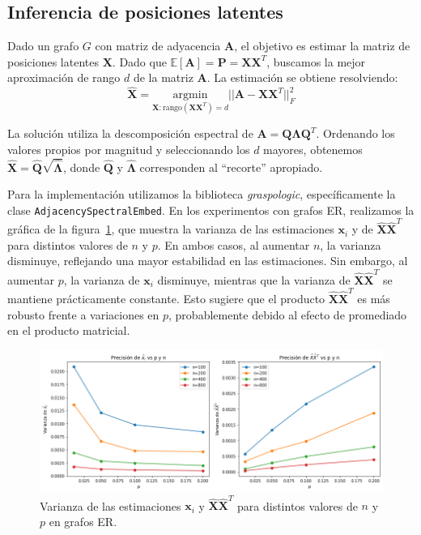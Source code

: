 \documentclass{article}
\begin{document}
\subsection{Inferencia de posiciones latentes}

Dado un grafo $G$ con matriz de adyacencia $\mathbf{A}$, el objetivo es estimar la matriz de posiciones latentes $\mathbf{X}$. Dado que $\mathbb{E}[\mathbf{A}] = \mathbf{P} = \mathbf{X}\mathbf{X}^T$, buscamos la mejor aproximación de rango $d$ de la matriz $\mathbf{A}$. La estimación se obtiene resolviendo:
\begin{equation}
    \hat{\mathbf{X}} = \underset{\mathbf{X}: \text{rango}(\mathbf{X}\mathbf{X}^T) = d}{\mathrm{argmin}} ||\mathbf{A} - \mathbf{X}\mathbf{X}^T||^2_F
\end{equation}

La solución utiliza la descomposición espectral de $\mathbf{A} = \mathbf{Q}\boldsymbol{\Lambda}\mathbf{Q}^T$. Ordenando los valores propios por magnitud y seleccionando los $d$ mayores, obtenemos $\hat{\mathbf{X}} = \hat{\mathbf{Q}}\sqrt{\hat{\boldsymbol{\Lambda}}}$, donde $\hat{\mathbf{Q}}$ y $\hat{\boldsymbol{\Lambda}}$ corresponden al ``recorte'' apropiado.

Para la implementación utilizamos la biblioteca \textit{graspologic}, específicamente la clase \newline
\verb|AdjacencySpectralEmbed|. En los experimentos con grafos ER, realizamos la gráfica de la figura~\ref{fig:precision}, que muestra la varianza de las estimaciones $\mathbf{x}_i$ y de $\hat{\mathbf{X}}\hat{\mathbf{X}}^T$ para distintos valores de $n$ y $p$. En ambos casos, al aumentar $n$, la varianza disminuye, reflejando una mayor estabilidad en las estimaciones. Sin embargo, al aumentar $p$, la varianza de $\mathbf{x}_i$ disminuye, mientras que la varianza de $\hat{\mathbf{X}}\hat{\mathbf{X}}^T$ se mantiene prácticamente constante. Esto sugiere que el producto $\hat{\mathbf{X}}\hat{\mathbf{X}}^T$ es más robusto frente a variaciones en $p$, probablemente debido al efecto de promediado en el producto matricial.

\begin{figure}[htb]
    \centering
    \includegraphics[width=0.7\linewidth]{images/precision.png}
    \caption{Varianza de las estimaciones $\mathbf{x}_i$ y $\hat{\mathbf{X}}\hat{\mathbf{X}}^T$ para distintos valores de $n$ y $p$ en grafos ER.}
    \label{fig:precision}
\end{figure}
\end{document}
